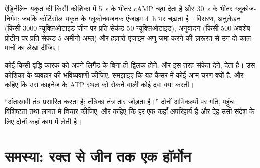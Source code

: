 \begin{exercise}[$\star\star\star$]\label{exo:b2:cell-signalling:10}
ऐड्रिनैलिन यकृत की किसी कोशिका में \qty{5}{s} के भीतर cAMP चढ़ा देता है और
\qty{30}{s} के भीतर ग्लूकोज़-निर्गम; जबकि कॉर्टिसोल यकृत के ग्लूकोनवजनक
एंजाइम \qty{4}{h} भर चढ़ाता है। विसरण, अनुलेखन (किसी
\qty{3000}{}-न्यूक्लिओटाइड जीन पर प्रति सेकंड \qty{50}{}
न्यूक्लिओटाइड), अनुवादन (किसी \num{500}-अवशेष प्रोटीन पर प्रति सेकंड
\qty{5}{} अमीनो अम्ल) और हज़ारों एंजाइम-अणु जमा करने की ज़रूरत से
उन दो काल-मानों का लेखा दीजिए।
\end{exercise}

\begin{exercise}[$\star\star\star$]\label{exo:b2:cell-signalling:11}
कोई  किसी वृद्धि-कारक  को
अपने लिगैंड के बिना ही द्विलक होने, और इस तरह संकेत देने, देता है। उस कोशिका के व्यवहार की
भविष्यवाणी कीजिए, समझाइए कि यह कैंसर में कोई आम चरण क्यों है, और कहिए
कि उस काइनेज़ के ATP स्थल को रोकने वाली कोई दवा क्या करती।
\end{exercise}

\begin{exercise}[$\star\star\star$]\label{exo:b2:cell-signalling:12}
``अंतःस्रावी तंत्र प्रसारित करता है; तंत्रिका तंत्र तार जोड़ता है।''
दोनों अभिकल्पों पर गति, पहुँच, विशिष्टता तथा लागत में विचार कीजिए, और
कहिए कि हर एक कहाँ अपरिहार्य है और देह उसी संदेश के लिए दोनों
कहाँ काम में लेती है।
\end{exercise}

\section{समस्या: रक्त से जीन तक एक हॉर्मोन}

